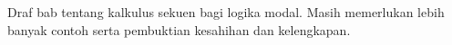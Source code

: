 \documentclass[../../../include/open-logic-chapter]{subfiles}
\begin{document}
\begin{editorial}
  Draf bab tentang kalkulus sekuen bagi logika modal. Masih memerlukan lebih
  banyak contoh serta pembuktian kesahihan dan kelengkapan.
\end{editorial}


\OLEndChapterHook
\end{document}
